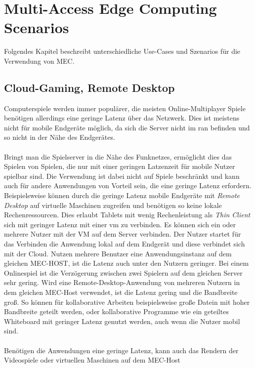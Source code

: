 \documentclass[runningheads]{llncs}
\numberwithin{figure}{section}
\begin{document}
\section{Multi-Access Edge Computing Scenarios}
\label{sec:Anwendungen}
Folgendes Kapitel beschreibt unterschiedliche Use-Cases und Szenarios für die Verwendung von MEC.\cite{patelContributorHuaweiVice}
\subsection{Cloud-Gaming, Remote Desktop}
\label{subsec:Cloud-Gaming}
Computerspiele werden immer populärer, die meisten Online-Multiplayer Spiele benötigen allerdings eine geringe 
Latenz über das Netzwerk. Dies ist meistens nicht für mobile Endgeräte möglich, da sich die Server nicht im \acrshort{ran} befinden und so
nicht in der Nähe des Endgerätes.
\\
\\
Bringt man die Spielserver in die Nähe des Funknetzes, ermöglicht dies das Spielen von Spielen, die nur mit einer geringen Latzenzeit 
für mobile Nutzer spielbar sind.
Die Verwendung ist dabei nicht auf Spiele beschränkt und kann auch für andere Anwendungen von Vorteil sein, 
die eine geringe Latenz erfordern. Beispielsweise können durch die geringe Latenz mobile Endgeräte mit \textit{Remote Desktop} auf
virtuelle Maschinen zugreifen und benötigen so keine lokale Rechenressourcen. Dies erlaubt Tablets mit wenig Rechenleistung als 
\textit{Thin Client} sich mit geringer Latenz mit einer \acrshort{vm} zu verbinden.
Es können sich ein oder mehrere Nutzer mit der VM auf dem Server verbinden. 
Der Nutzer startet für das Verbinden
die Anwendung lokal auf dem Endgerät und diese verbindet sich mit der Cloud. Nutzen mehrere Benutzer eine Anwendungsinstanz auf dem 
gleichen MEC-HOST, ist die Latenz auch unter den Nutzern geringer. Bei einem Onlinespiel ist die Verzögerung zwischen zwei Spielern
auf dem gleichen Server sehr gering. Wird eine Remote-Desktop-Anwendung von mehreren Nutzern in dem gleichen MEC-Host verwendet, 
ist die Latenz gering und die Bandbreite groß. 
So können für kollaborative Arbeiten beispielsweise große Datein mit hoher Bandbreite geteilt werden, oder kollaborative Programme wie
ein geteiltes Whiteboard mit geringer Latenz genutzt werden, auch wenn die Nutzer mobil sind. \cite{etsiMultiaccessEdgeComputing}
\\
\\
Benötigen die Anwendungen eine geringe Latenz, kann auch das Rendern der Videospiele oder virtuellen Maschinen auf dem MEC-Host 
\end{document}
